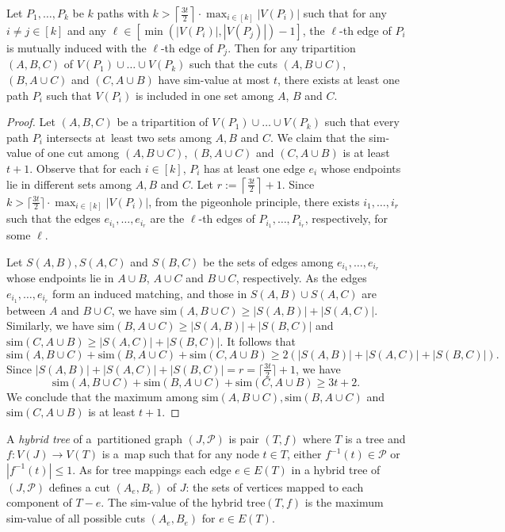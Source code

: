 \documentclass[a4paper,UKenglish,cleveref,hyperref,autoref]{lipics-v2021}
\renewcommand{\geq}{\geqslant}
\renewcommand{\leq}{\leqslant}
\renewcommand{\le}{\leq}
\newcommand{\ssim}{\text{sim}}
\newcommand{\tmaps}{tree mappings\xspace}
\newcommand{\htree}{hybrid tree\xspace}
\begin{document}
\begin{lemma}\label{lem:tricut-doesnt-cut}
Let $P_1, \dots, P_k$ be $k$ paths with $k > \left \lceil \frac{3t}{2} \right \rceil \cdot \max_{i \in [k]} |V(P_i)|$ such that for any $i \neq j \in [k]$ and any $\ell \in [\min(|V(P_i)|,|V(P_j)|)-1]$, the $\ell$-th edge of $P_i$ is mutually induced with the $\ell$-th edge of $P_j$.
Then for any tripartition $(A, B, C)$ of $V(P_1) \cup \ldots \cup V(P_k)$ such that the cuts $(A,B \cup C)$, $(B,A \cup C)$ and $(C, A \cup B)$ have sim-value at most $t$, there exists at least one path $P_i$ such that $V(P_i)$ is included in one set among $A$, $B$ and $C$.
\end{lemma}
\begin{proof}
	Let $(A,B,C)$ be a tripartition of $V(P_1) \cup \ldots \cup V(P_k)$ such that every path $P_i$ intersects at~least two sets among $A,B$ and $C$.
	We claim that the sim-value of one cut among $(A,B\cup C)$, $(B,A\cup C)$ and $(C, A\cup B)$ is at least $t+1$.
	Observe that for each $i\in[k]$, $P_i$ has at least one edge $e_i$ whose endpoints lie in different sets among $A,B$ and $C$.
	Let $r := \left \lceil \frac{3t}{2}\right \rceil +1$.
	Since $k > \lceil \frac{3t}{2} \rceil \cdot \max_{i \in [k]} |V(P_i)|$, from the pigeonhole principle, there exists $i_1, \ldots, i_r$ such that the edges $e_{i_1}, \ldots, e_{i_r}$ are the $\ell$-th edges of $P_{i_1}, \ldots, P_{i_{r}}$, respectively, for some $\ell$.
	
	Let $S(A,B), S(A,C)$ and $S(B,C)$ be the sets of edges among $e_{i_1},\dots,e_{i_{r}}$ whose endpoints lie in $A\cup B$, $A\cup C$ and $B\cup C$, respectively.
	As the edges $e_{i_1},\dots,e_{i_{r}}$ form an induced matching, and those in $S(A,B)\cup S(A,C)$ are between $A$ and $B\cup C$, we have $\ssim(A,B\cup C) \geq |S(A,B)|+ |S(A,C)|$.
	Similarly, we have $\ssim(B,A\cup C) \geq |S(A,B)|+ |S(B,C) |$ and $\ssim(C,A\cup B) \geq |S(A,C)|+ |S(B,C) |$.
	It follows that $$\ssim(A,B\cup C) + \ssim(B,A\cup C) + \ssim(C, A\cup B) \geq 2 (|S(A,B)|+  |S(A,C)| + | S(B,C)|).$$
	Since $|S(A,B)|+  |S(A,C)| + |S(B,C)| = r = \lceil \frac{3t}{2} \rceil +1$, we have $$\ssim(A,B\cup C) + \ssim(B,A\cup C) + \ssim(C, A\cup B) \geq 3t +2.$$
	We conclude that the maximum among $\ssim(A,B\cup C), \ssim(B,A\cup C)$ and $\ssim(C, A\cup B)$ is at least $t+1$.
\end{proof}

A \emph{\htree} of a~partitioned graph $(J, \mathcal P)$ is pair $(T, f)$ where $T$ is a tree and $f \colon V(J) \rightarrow V(T)$ is a~map such that for any node $t \in T$, either $f^{-1}(t) \in \mathcal P$ or $|f^{-1}(t)| \le 1$.
As for \tmaps each edge $e \in E(T)$ in a \htree of $(J, \mathcal P)$ defines a cut $(A_e, B_e)$ of $J$: the sets of vertices mapped to each component of $T-e$.
The sim-value of the \htree $(T, f)$ is the maximum sim-value of all possible cuts $(A_e, B_e)$ for $e \in E(T)$.
\end{document}
